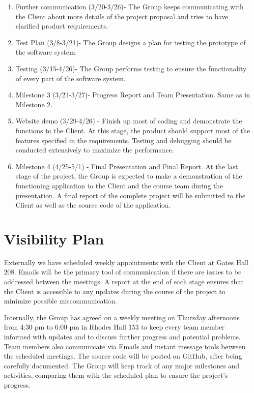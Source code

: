 \documentclass{article}
\begin{document}
\begin{enumerate}[I]
    \item Further communication (3/20-3/26)-  The Group keeps communicating with the Client about more details of the project proposal and tries to have clarified product requirements.
    \item Test Plan (3/8-3/21)- The Group designs a plan for testing the prototype of the software system.
    \item Testing (3/15-4/26)- The Group performs testing to ensure the functionality of every part of the software system.
    \item Milestone 3 (3/21-3/27)- Progress Report and Team Presentation. Same as in Milestone 2.
    \item Website demo (3/29-4/26) - Finish up most of coding and demonstrate the functions to the Client. At this stage, the product should support most of the features specified in the requirements. Testing and debugging should be conducted extensively to maximize the performance.
    \item Milestone 4 (4/25-5/1) - Final Presentation and Final Report. At the last stage of the project, the Group is expected to make a demonstration of the functioning application to the Client and the course team during the presentation. A final report of the complete project will be submitted to the Client as well as the source code of the application.
\end{enumerate}
\section{Visibility Plan}
Externally we have scheduled weekly appointments with the Client at Gates Hall 208. Emails will be the primary tool of communication if there are issues to be addressed between the meetings. A report at the end of each stage ensures that the Client is accessible to any updates during the course of the project to minimize possible miscommunication.

\vspace{0.4cm}Internally, the Group has agreed on a weekly meeting on Thursday afternoons from 4:30 pm to 6:00 pm in Rhodes Hall 153 to keep every team member informed with updates and to discuss further progress and potential problems. Team members also communicate via Emails and instant message tools between the scheduled meetings. The source code will be posted on GitHub, after being carefully documented. The Group will keep track of any major milestones and activities, comparing them with the scheduled plan to ensure the project’s progress.
\end{document}
